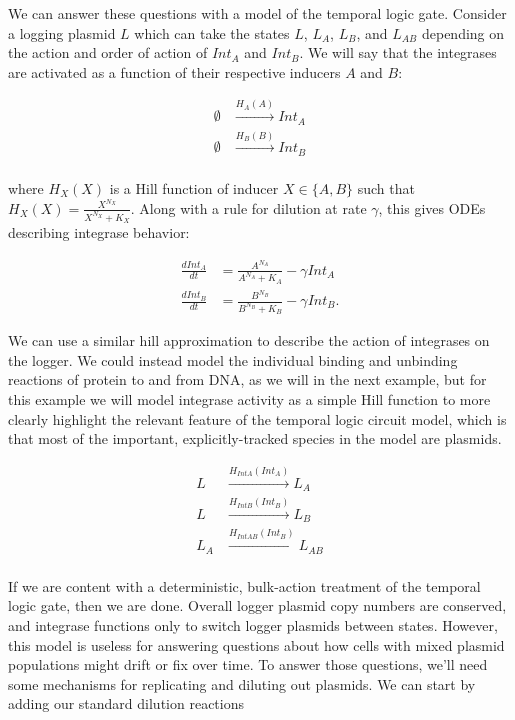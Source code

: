 \documentclass[preprint,12pt]{elsarticle}
\begin{document}
We can answer these questions with a model of the temporal logic gate. Consider a logging plasmid $L$ which can take the states $L$, $L_A$, $L_B$, and $L_{AB}$ depending on the action and order of action of $Int_A$ and $Int_B$. We will say that the integrases are activated as a function of their respective inducers $A$ and $B$:

\begin{align}
	\emptyset &\xrightarrow{H_{A}(A)} Int_A\\
	\emptyset &\xrightarrow{H_{B}(B)} Int_B\\	
\end{align}

where $H_{X}(X)$ is a Hill function of inducer $X \in \{A, B\}$ such that $H_{X}(X) = \frac{X^{N_X}}{X^{N_X} + K_X}$. Along with a rule for dilution at rate $\gamma$, this gives ODEs describing integrase behavior:

\begin{align}
	\frac{dInt_A}{dt}  &= \frac{A^{N_A}}{A^{N_A} + K_A} - \gamma Int_A\\
	\frac{dInt_B}{dt}  &= \frac{B^{N_B}}{B^{N_B} + K_B} - \gamma Int_B.
\end{align}

We can use a similar hill approximation to describe the action of integrases on the logger. We could instead model the individual binding and unbinding reactions of protein to and from DNA, as we will in the next example, but for this example we will model integrase activity as a simple Hill function to more clearly highlight the relevant feature of the temporal logic circuit model, which is that most of the important, explicitly-tracked species in the model are plasmids. 

\begin{align}
	L &\xrightarrow{H_{IntA}(Int_A)} L_A\\
	L &\xrightarrow{H_{IntB}(Int_B)} L_B\\
	L_A &\xrightarrow{H_{IntAB}(Int_B)} L_{AB}\\
\end{align}

If we are content with a deterministic, bulk-action treatment of the temporal logic gate, then we are done. Overall logger plasmid copy numbers are conserved, and integrase functions only to switch logger plasmids between states. However, this model is useless for answering questions about how cells with mixed plasmid populations might drift or fix over time. To answer those questions, we'll need some mechanisms for replicating and diluting out plasmids. We can start by adding our standard dilution reactions
\end{document}

